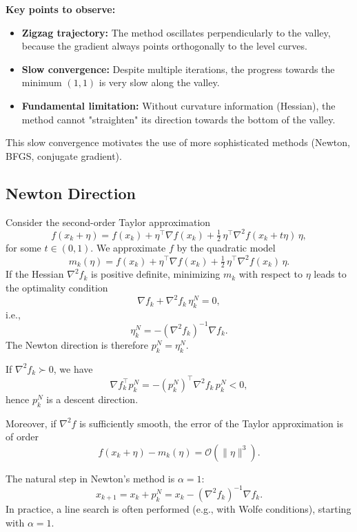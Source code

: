 \begin{figureexplanation}
\textbf{Key points to observe:}
\begin{itemize}
    \item \textbf{Zigzag trajectory:} The method oscillates perpendicularly to the valley, because the gradient always points orthogonally to the level curves.
    \item \textbf{Slow convergence:} Despite multiple iterations, the progress towards the minimum $(1,1)$ is very slow along the valley.
    \item \textbf{Fundamental limitation:} Without curvature information (Hessian), the method cannot "straighten" its direction towards the bottom of the valley.
\end{itemize}
This slow convergence motivates the use of more sophisticated methods (Newton, BFGS, conjugate gradient).
\end{figureexplanation}
\subsection{Newton Direction}
\label{subsec:2.4.2}

Consider the second-order Taylor approximation
\[
    f(x_k + \eta)
    = f(x_k) + \eta^\top \nabla f(x_k)
      + \tfrac{1}{2}\,\eta^\top \nabla^2 f(x_k + t\eta)\,\eta,
\]
for some $t \in (0,1)$. We approximate $f$ by the quadratic model
\[
    m_k(\eta)
    = f(x_k) + \eta^\top \nabla f(x_k)
      + \tfrac{1}{2}\,\eta^\top \nabla^2 f(x_k)\,\eta.
\]
If the Hessian $\nabla^2 f_k$ is positive definite, minimizing $m_k$ with respect to $\eta$
leads to the optimality condition
\[
    \nabla f_k + \nabla^2 f_k\,\eta_k^N = 0,
\]
i.e.,
\begin{equation}
    \eta_k^N = -(\nabla^2 f_k)^{-1} \nabla f_k.
\end{equation}
The Newton direction is therefore $p_k^N = \eta_k^N$.

If $\nabla^2 f_k \succ 0$, we have
\[
    \nabla f_k^\top p_k^N
    = - (p_k^N)^\top \nabla^2 f_k\, p_k^N < 0,
\]
hence $p_k^N$ is a descent direction.

Moreover, if $\nabla^2 f$ is sufficiently smooth, the error of the Taylor
approximation is of order
\[
    f(x_k + \eta) - m_k(\eta) = \mathcal{O}(\|\eta\|^3).
\]

\begin{remarque}
The natural step in Newton's method is $\alpha = 1$:
\[
    x_{k+1} = x_k + p_k^N = x_k - (\nabla^2 f_k)^{-1}\nabla f_k.
\]
In practice, a line search is often performed (e.g., with Wolfe
conditions), starting with $\alpha=1$.
\end{remarque}

